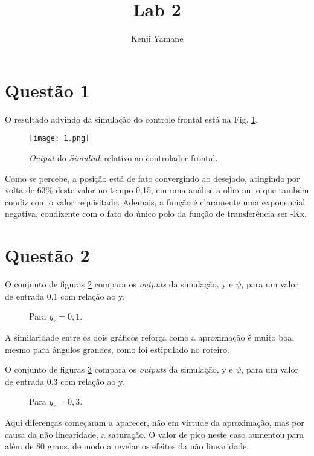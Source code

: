 \documentclass{article}[twocolumn]
\title{Lab 2}
\author{Kenji Yamane}
\begin{document}
	\maketitle
	\section{Quest\~ao 1}
	O resultado advindo da simula\c{c}\~ao do controle frontal est\'a na Fig.
	\ref{fig:frontal}.
	\begin{figure}[H]
		\centering
		\texttt{[image: 1.png]}
		\caption{\textit{Output} do \textit{Simulink} relativo ao controlador frontal.}
		\label{fig:frontal}
	\end{figure}
	Como se percebe, a posi\c{c}\~ao est\'a de fato convergindo ao desejado, atingindo
	por volta de 63\% deste valor no tempo 0,15, em uma an\'alise a olho nu, o que tamb\'em
	condiz com o valor requisitado. Ademais, a fun\c{c}\~ao \'e claramente uma
	exponencial negativa, condizente com o fato do \'unico polo da fun\c{c}\~ao de
	transfer\^encia ser -Kx.
	\section{Quest\~ao 2}
	O conjunto de figuras \ref{fig:lateral1} compara os \textit{outputs} da simula\c{c}\~ao,
	y e $\psi$, para um valor de entrada 0,1 com rela\c{c}\~ao ao y.
	\begin{figure}[H]
		\centering
		\caption{Para $y_r = 0,1$.}
		\label{fig:lateral1}
	\end{figure}
	A similaridade entre os dois gr\'aficos refor\c{c}a como a aproxima\c{c}\~ao \'e
	muito boa, mesmo para \^angulos grandes, como foi estipulado no roteiro.

	O conjunto de figuras \ref{fig:lateral3} compara os \textit{outputs} da simula\c{c}\~ao,
	y e $\psi$, para um valor de entrada 0,3 com rela\c{c}\~ao ao y.
	\begin{figure}[H]
		\centering
		\caption{Para $y_r = 0,3$.}
		\label{fig:lateral3}
	\end{figure}
	Aqui diferen\c{c}as come\c{c}aram a aparecer, n\~ao em virtude da aproxima\c{c}\~ao,
	mas por causa da n\~ao linearidade, a satura\c{c}\~ao. O valor de pico neste caso
	aumentou para al\'em de 80 graus, de modo a revelar os efeitos da n\~ao linearidade.
\end{document}
